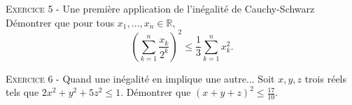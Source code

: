 \documentclass[11pt]{article}
\begin{document}


\vskip0.3cm\noindent\textsc{Exercice 5} - Une première application de l'inégalité de Cauchy-Schwarz
\vskip0.2cm
Démontrer que pour tous $x_1,\dots,x_n\in\mathbb R,$
$$\left(\sum_{k=1}^n \frac{x_k}{2^k}\right)^2\leq\frac 13\sum_{k=1}^n x_k^2.$$




\vskip0.3cm\noindent\textsc{Exercice 6} - Quand une inégalité en implique une autre...
\vskip0.2cm
Soit $x,y,z$ trois réels tels que $2x^2+y^2+5z^2\leq 1$. Démontrer que $(x+y+z)^2\leq\frac {17}{10}.$




\vskip0.5cm

\end{document}
